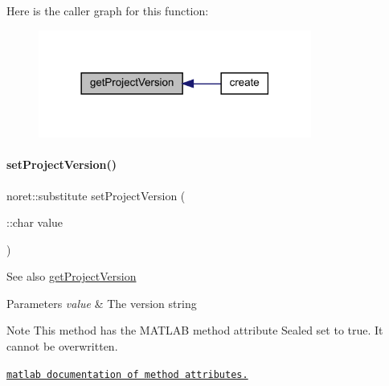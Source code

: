 Here is the caller graph for this function\+:\nopagebreak
\begin{figure}[H]
\begin{center}
\leavevmode
\includegraphics[width=254pt]{class_matlab_doc_maker_a1070db754e27b70e775524e2392a1390_icgraph}
\end{center}
\end{figure}
\mbox{\label{class_matlab_doc_maker_a5cf2636bc8dac454f314847775fc9da7}} 
\paragraph{\texorpdfstring{set\+Project\+Version()}{setProjectVersion()}}
{\footnotesize\ttfamily noret\+::substitute set\+Project\+Version (\begin{DoxyParamCaption}\item[{\+::char}]{value }\end{DoxyParamCaption})\hspace{0.3cm}{\ttfamily [static]}}

\begin{DoxySeeAlso}{See also}
\hyperlink{class_matlab_doc_maker_a1070db754e27b70e775524e2392a1390}{get\+Project\+Version}
\end{DoxySeeAlso}

\begin{DoxyParams}{Parameters}
{\em value} & The version string\\
\hline
\end{DoxyParams}
\begin{DoxyNote}{Note}
This method has the M\+A\+T\+L\+AB method attribute {\ttfamily Sealed} set to true. It cannot be overwritten. 

\href{http://www.mathworks.com/help/matlab/matlab_oop/method-attributes.html}{\tt matlab documentation of method attributes.} 
\end{DoxyNote}


